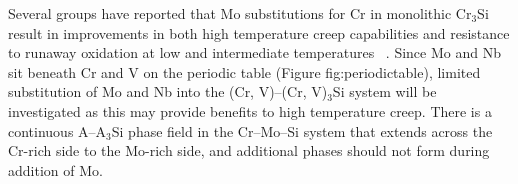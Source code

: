 Several groups have reported that Mo substitutions for Cr in monolithic Cr$_3$Si result in improvements in both high temperature creep capabilities and resistance to runaway oxidation at low and intermediate temperatures ~\cite{raj95}. Since Mo and Nb sit beneath Cr and V on the periodic table (Figure {fig:periodictable}), limited substitution of Mo and Nb into the (Cr, V)--(Cr, V)$_3$Si system will be investigated as this may provide benefits to high temperature creep. There is a continuous A--A$_3$Si phase field in the Cr--Mo--Si system that extends across the Cr-rich side to the Mo-rich side, and additional phases should not form during addition of Mo.